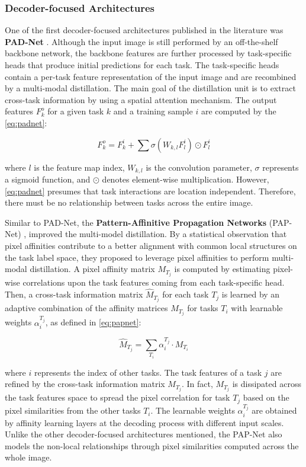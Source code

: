 \subsubsection{Decoder-focused Architectures}

One of the first decoder-focused architectures published in the literature was \textbf{PAD-Net} \citep{xu2018pad}. Although the input image is still performed by an off-the-shelf backbone network, the backbone features are further processed by task-specific heads that produce initial predictions for each task. The task-specific heads contain a per-task feature representation of the input image and are recombined by a multi-modal distillation. The main goal of the distillation unit is to extract cross-task information by using a spatial attention mechanism. The output features $F_k^o$ for a given task $k$ and a training sample $i$ are computed by the \autoref{eq:padnet}:

\begin{equation}
\label{eq:padnet}
F_k^o = F_k^i + \sum {\sigma (W_{k,l}F_l^i) \odot F_l^i}
\end{equation}

\noindent where $l$ is the feature map index, $W_{k,l}$ is the convolution parameter, $\sigma$ represents a sigmoid function, and $\odot$ denotes element-wise multiplication. However, \autoref{eq:padnet} presumes that task interactions are location independent. Therefore, there must be no relationship between tasks across the entire image.

Similar to PAD-Net, the \textbf{Pattern-Affinitive Propagation Networks} (PAP-Net) \citep{zhang2019pattern}, improved the multi-model distillation. By a statistical observation that pixel affinities contribute to a better alignment with common local structures on the task label space, they proposed to leverage pixel affinities to perform multi-modal distillation. A pixel affinity matrix $M_{T_j}$ is computed by estimating pixel-wise correlations upon the task features coming from each task-specific head. Then, a cross-task information matrix $\hat{M}_{T_j}$ for each task $T_j$ is learned by an adaptive combination of the affinity matrices $M_{T_j}$ for tasks $T_i$ with learnable weights $\alpha_i^{T_j}$, as defined in \autoref{eq:papnet}:

\begin{equation}
\label{eq:papnet}
\hat{M}_{T_j} = \sum_{T_i} {\alpha_i^{T_j} \cdot M_{T_i}}
\end{equation}

\noindent
where $i$ represents the index of other tasks. The task features of a task $j$ are refined by the cross-task information matrix $M_{T_j}$. In fact, $M_{T_j}$ is dissipated across the task features space to spread the pixel correlation for task $T_j$ based on the pixel similarities from the other tasks $T_i$. The learnable weights $\alpha_i^{T_j}$ are obtained by affinity learning layers at the decoding process with different input scales. Unlike the other decoder-focused architectures mentioned, the PAP-Net also models the non-local relationships through pixel similarities computed across the whole image.

